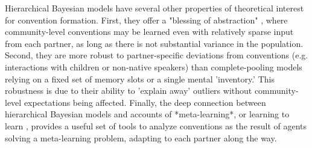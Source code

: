 Hierarchical Bayesian models have several other properties of theoretical interest for convention formation.
First, they offer a "blessing of abstraction" \cite{GoodmanUllmanTenenbaum11_TheoryOfCausality}, where community-level conventions may be learned even with relatively sparse input from each partner, as long as there is not substantial variance in the population. 
Second, they are more robust to partner-specific deviations from conventions (e.g. interactions with children or non-native speakers) than complete-pooling models relying on a fixed set of memory slots or a single mental 'inventory.' 
This robustness is due to their ability to 'explain away' outliers without community-level expectations being affected. 
Finally, the deep connection between hierarchical Bayesian models and accounts of *meta-learning*, or learning to learn \cite{grant_recasting_2018}, provides a useful set of tools to analyze conventions as the result of agents solving a meta-learning problem, adapting to each partner along the way.
